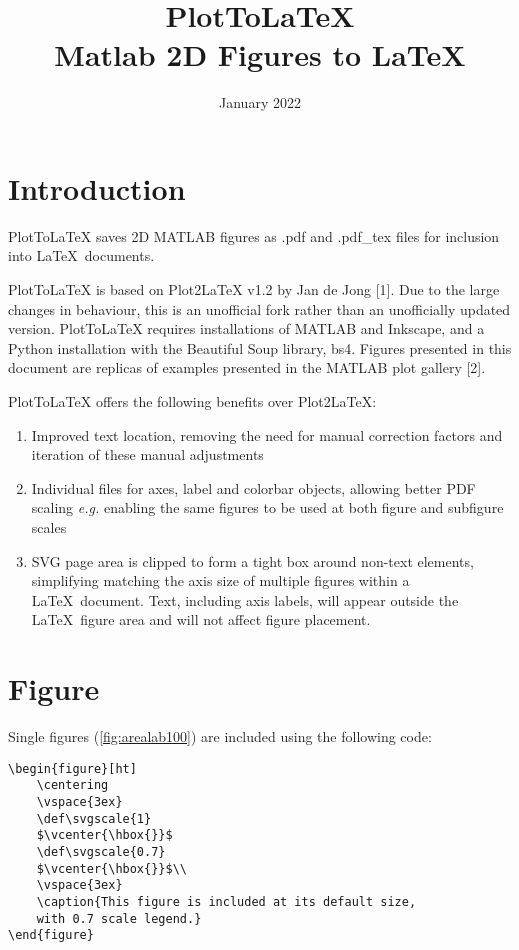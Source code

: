 \documentclass{article}
\title{PlotToLaTeX\\ \large Matlab 2D Figures to \LaTeX}
\author{}
\date{January 2022}
\begin{document}
\maketitle

\section{Introduction}
PlotToLaTeX saves 2D MATLAB figures as .pdf and .pdf\_tex files for inclusion into \LaTeX\ documents.

PlotToLaTeX is based on Plot2LaTeX v1.2 by Jan de Jong [1]. Due to the large changes in behaviour, this is an unofficial fork rather than an unofficially updated version. PlotToLaTeX requires installations of MATLAB and Inkscape, and a Python installation with the Beautiful Soup library, bs4. Figures presented in this document are replicas of examples presented in the MATLAB plot gallery [2].

PlotToLaTeX offers the following benefits over Plot2LaTeX:
\begin{enumerate}
    \item Improved text location, removing the need for manual correction factors and iteration of these manual adjustments
    \item Individual files for axes, label and colorbar objects, allowing better PDF scaling \textit{e.g.} enabling the same figures to be used at both figure and subfigure scales
    \item SVG page area is clipped to form a tight box around non-text elements, simplifying matching the axis size of multiple figures within a \LaTeX\ document. Text, including axis labels, will appear outside the \LaTeX\ figure area and will not affect figure placement.
\end{enumerate}

\section{Figure}
Single figures (\ref{fig:arealab100}) are included using the following code:
\begin{verbatim}
\begin{figure}[ht]
    \centering
    \vspace{3ex}
    \def\svgscale{1}
    $\vcenter{\hbox{}}$
    \def\svgscale{0.7}
    $\vcenter{\hbox{}}$\\
    \vspace{3ex}
    \caption{This figure is included at its default size,
    with 0.7 scale legend.}
\end{figure}
\end{verbatim}
\end{document}
